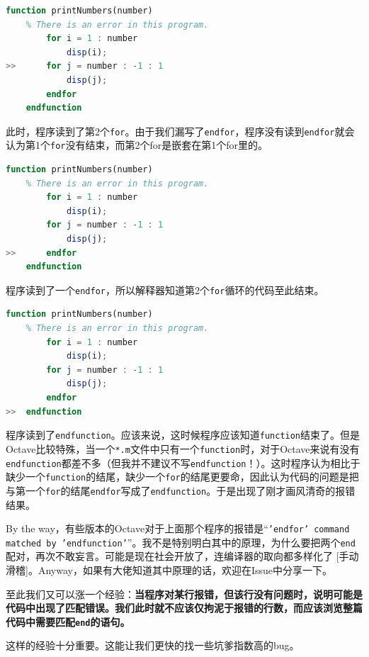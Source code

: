 \documentclass[12pt]{article}
\begin{document}
\begin{spacing}{1.4}
\begin{lstlisting}[language=octave]
    function printNumbers(number)
    % There is an error in this program.
        for i = 1 : number
            disp(i);
>>      for j = number : -1 : 1
            disp(j);
        endfor
    endfunction
\end{lstlisting}

此时，程序读到了第2个\texttt{for}。由于我们漏写了\texttt{endfor}，程序没有读到\texttt{endfor}就会认为第1个\texttt{for}没有结束，而第2个for是嵌套在第1个for里的。

\begin{lstlisting}[language=octave]
    function printNumbers(number)
    % There is an error in this program.
        for i = 1 : number
            disp(i);
        for j = number : -1 : 1
            disp(j);
>>      endfor
    endfunction
\end{lstlisting}

程序读到了一个\texttt{endfor}，所以解释器知道第2个\texttt{for}循环的代码至此结束。

\begin{lstlisting}[language=octave]
    function printNumbers(number)
    % There is an error in this program.
        for i = 1 : number
            disp(i);
        for j = number : -1 : 1
            disp(j);
        endfor
>>  endfunction
\end{lstlisting}

程序读到了\texttt{endfunction}。应该来说，这时候程序应该知道\texttt{function}结束了。但是Octave比较特殊，当一个\texttt{*.m}文件中只有一个\texttt{function}时，对于Octave来说有没有\texttt{endfunction}都差不多（但我并不建议不写\texttt{endfunction}！）。这时程序认为相比于缺少一个\texttt{function}的结尾，缺少一个\texttt{for}的结尾更要命，因此认为代码的问题是把与第一个\texttt{for}的结尾\texttt{endfor}写成了\texttt{endfunction}。于是出现了刚才画风清奇的报错结果。

By the way，有些版本的Octave对于上面那个程序的报错是“\texttt{'endfor' command matched by 'endfunction'}”。我不是特别明白其中的原理，为什么要把两个\texttt{end}配对，再次不敢妄言。可能是现在社会开放了，连编译器的取向都多样化了 [手动滑稽]。Anyway，如果有大佬知道其中原理的话，欢迎在Issue中分享一下。

至此我们又可以涨一个经验：\textbf{当程序对某行报错，但该行没有问题时，说明可能是代码中出现了匹配错误。我们此时就不应该仅拘泥于报错的行数，而应该浏览整篇代码中需要匹配\texttt{end}的语句。}

这样的经验十分重要。这能让我们更快的找一些坑爹指数高的bug。


\end{spacing}
\end{document}
